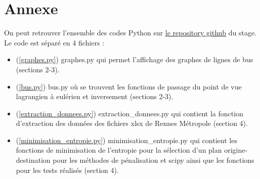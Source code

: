 \documentclass[12pt]{article}
\begin{document}
\section{Annexe}
\label{annexe}
On peut retrouver l'ensemble des codes Python sur \href{https://github.com/GaryTheCaptn/graphes_stage}{le repository github} du stage. Le code est séparé en 4 fichiers :\\
\begin{itemize}
    \item (\ref{graphes.py}) graphes.py  qui permet l'affichage des graphes de lignes de bus (sections 2-3).\\
    \item (\ref{bus.py}) bus.py où se trouvent les fonctions de passage du point de vue lagrangien à eulérien et inversement (sections 2-3).\\
    \item (\ref{extraction_donnees.py}) extraction\_donnees.py qui contient la fonction d'extraction des données des fichiers xlsx de Rennes Métropole (section 4).\\
    \item (\ref{minimisation_entropie.py}) minimisation\_entropie.py qui contient les fonctions de minimisation de l'entropie pour la sélection d'un plan origine-destination pour les méthodes de pénalisation et scipy ainsi que les fonctions pour les tests réalisés (section 4).
\end{itemize}
\end{document}
